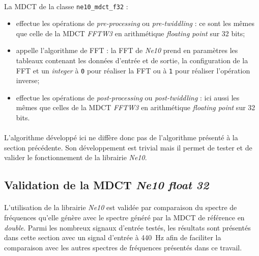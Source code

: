 \documentclass{article}
\begin{document}
    \paragraph{}
    La MDCT de la classe \texttt{ne10\_mdct\_f32} :
    \begin{itemize}
        \item effectue les opérations de \emph{pre-processing} ou \emph{pre-twiddling} : ce sont les mêmes que celle de la MDCT \emph{FFTW3} en arithmétique \emph{floating point} sur 32 bits;
        \item appelle l'algorithme de FFT : la FFT de \emph{Ne10} prend en paramètres les tableaux contenant les données d'entrée et de sortie, la configuration de la FFT et un \emph{integer} à \texttt{0} pour réaliser la FFT ou à \texttt{1} pour réaliser l'opération inverse;
        \item effectue les opérations de \emph{post-processing} ou \emph{post-twiddling} : ici aussi les mêmes que celles de la MDCT \emph{FFTW3} en arithmétique \emph{floating point} sur 32 bits.
    \end{itemize}

    \paragraph{}
    L'algorithme développé ici ne diffère donc pas de l'algorithme présenté à la section précédente. Son développement est trivial mais il permet de tester et de valider le fonctionnement de la librairie \emph{Ne10}.

    \subsection{Validation de la MDCT \emph{Ne10 float 32}}
    \paragraph{}
    L'utilisation de la librairie \emph{Ne10} est validée par comparaison du spectre de fréquences qu'elle génère avec le spectre généré par la MDCT de référence en \emph{double}. Parmi les nombreux signaux d'entrée testés, les résultats sont présentés dans cette section avec un signal d'entrée à \SI{440}{\hertz} afin de faciliter la comparaison avec les autres spectres de fréquences présentés dans ce travail.
\end{document}
